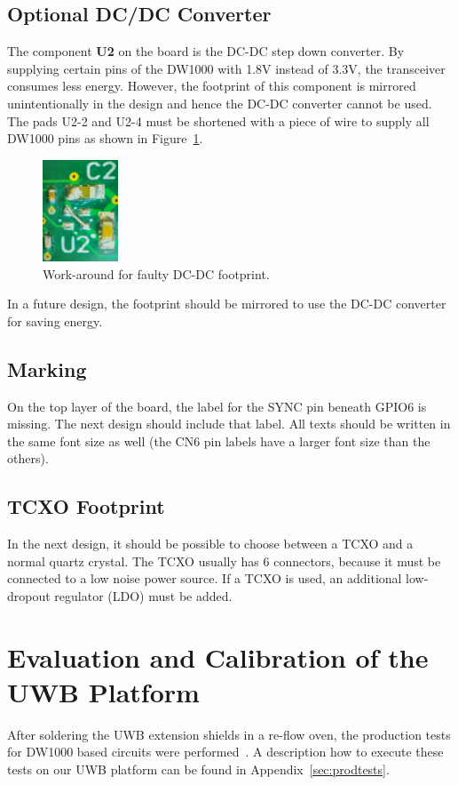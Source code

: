 \documentclass[journal,comsoc]{IEEEtran}
\begin{document}
\subsection{Optional DC/DC Converter}
The component \textbf{U2} on the board is the DC-DC step down converter. 
By supplying certain pins of the DW1000 with 1.8V instead of 3.3V, the transceiver consumes less energy. 
However, the footprint of this component is mirrored unintentionally in the design and hence the DC-DC converter cannot be used. 
The pads U2-2 and U2-4 must be shortened with a piece of wire to supply all DW1000 pins as shown in Figure~\ref{fig:dcdc}.
\begin{figure}%
	\centering
	\includegraphics[width=0.2\textwidth]{Figures/dcdc}
	\caption{Work-around for faulty DC-DC footprint.}
	\label{fig:dcdc}
\end{figure}
In a future design, the footprint should be mirrored to use the DC-DC converter for saving energy.

\subsection{Marking}
On the top layer of the board, the label for the SYNC pin beneath GPIO6 is missing.
The next design should include that label.
All texts should be written in the same font size as well (the CN6 pin labels have a larger font size than the others).

\subsection{TCXO Footprint}
In the next design, it should be possible to choose between a TCXO and a normal quartz crystal.
The TCXO usually has 6 connectors, because it must be connected to a low noise power source.
If a TCXO is used, an additional low-dropout regulator (LDO) must be added.


\section{Evaluation and Calibration of the UWB Platform}
\label{sec:testingandcalibrating}
After soldering the UWB extension shields in a re-flow oven, the production tests for DW1000 based circuits were performed~\cite{prodtest}.
A description how to execute these tests on our UWB platform can be found in Appendix~\ref{sec:prodtests}.
\end{document}
